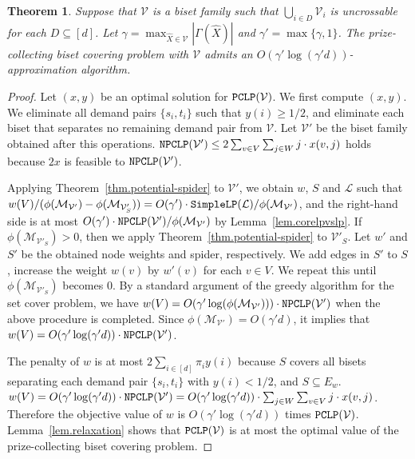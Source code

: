 \documentclass[11pt]{article}
\newtheorem{theorem}{Theorem}
\newcommand{\Mfam}{\mathcal{M}}
\newcommand{\Vfam}{\mathcal{V}}
\newcommand{\Lfam}{\mathcal{L}}
\newcommand{\LP}{{\tt PCLP}}
\newcommand{\NPCLP}{{\tt NPCLP}}
\newcommand{\CoreLP}{{\tt SimpleLP}}
\begin{document}
\begin{theorem}\label{thm.main}
 Suppose that $\Vfam$ is a biset family such that $\bigcup_{i \in D}\Vfam_i$ is
 uncrossable for each $D \subseteq [d]$.
 Let $\gamma=\max_{\hat{X}\in \Vfam}|\Gamma(\hat{X})|$
 and $\gamma'=\max\{\gamma,1\}$.
 The prize-collecting biset covering problem with $\Vfam$ admits an $O(\gamma'
 \log(\gamma' d))$-approximation algorithm.
\end{theorem}
\begin{proof}
 Let $(x,y)$ be an optimal solution for $\LP(\Vfam)$.
 We first compute $(x,y)$.
 We eliminate all demand pairs $\{s_i,t_i\}$ such that $y(i)\geq 1/2$,
 and eliminate each biset that separates no remaining demand pair from $\Vfam$.
 Let $\Vfam'$ be the biset family obtained after this operations.
 $\NPCLP(\Vfam') \leq 2 \sum_{v \in V}\sum_{j \in W}j \cdot x(v,j)$ holds
 because $2x$ is feasible to $\NPCLP(\Vfam')$.

 Applying Theorem~\ref{thm.potential-spider} to $\Vfam'$,
 we obtain $w$, $S$ and $\Lfam$ 
 such that
 $w(V)/(\phi(\Mfam_{\Vfam'})-\phi(\Mfam_{\Vfam'_S}))=O(\gamma')\cdot
 \CoreLP(\Lfam)/\phi(\Mfam_{\Vfam'})$,
and the right-hand side is at most $O(\gamma') \cdot \NPCLP(\Vfam')/\phi(\Mfam_{\Vfam'})$
 by Lemma~\ref{lem.corelpvslp}.
 If $\phi(\Mfam_{\Vfam'_S})> 0$, then
 we apply
 Theorem~\ref{thm.potential-spider} to $\Vfam'_S$.
 Let $w'$ and $S'$ be the obtained node weights and spider, respectively.
 We add edges in $S'$ to $S$,
 increase the weight $w(v)$ by $w'(v)$ for each $v\in V$.
 We repeat this until $\phi(\Mfam_{\Vfam'_S})$ becomes 0.
 By a standard argument of the greedy algorithm for the set cover problem,
 we have $w(V) = O(\gamma' \log(\phi(\Mfam_{\Vfam'}))) \cdot \NPCLP(\Vfam')$
 when the above procedure is completed.
 Since $\phi(\Mfam_{\Vfam'})=O(\gamma' d)$,
 it implies that $w(V)=O(\gamma' \log(\gamma' d)) \cdot \NPCLP(\Vfam')$.

The penalty of $w$ is at most $2\sum_{i \in [d]}\pi_i y(i)$
 because $S$ covers all bisets separating each demand pair $\{s_i,t_i\}$
 with $y(i)<1/2$, and $S\subseteq E_w$.
 $w(V) = O(\gamma' \log(\gamma' d)) \cdot \NPCLP(\Vfam')
 =  O(\gamma' \log(\gamma' d)) \cdot\sum_{j\in W}\sum_{v \in V}j\cdot x(v,j)$.
 Therefore the objective value of $w$ is 
$O(\gamma' \log(\gamma' d))$ times $\LP(\Vfam)$.
 Lemma~\ref{lem.relaxation} shows that $\LP(\Vfam)$ is at most the
 optimal value of the prize-collecting biset covering problem.
\end{proof}
\end{document}
